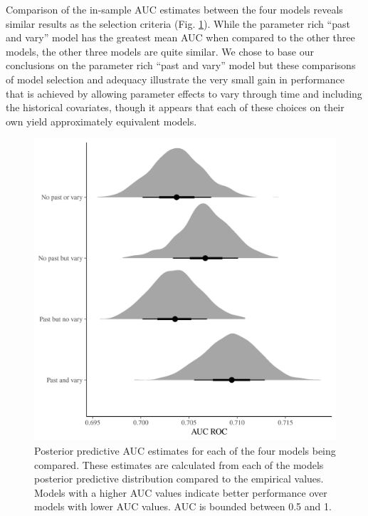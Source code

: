 \documentclass[12pt,letterpaper]{article}
\begin{document}
Comparison of the in-sample AUC estimates between the four models reveals similar results as the selection criteria (Fig. \ref{fig:roc_hist}). While the parameter rich ``past and vary'' model has the greatest mean AUC when compared to the other three models, the other three models are quite similar. We chose to base our conclusions on the parameter rich ``past and vary'' model but these comparisons of model selection and adequacy illustrate the very small gain in performance that is achieved by allowing parameter effects to vary through time and including the historical covariates, though it appears that each of these choices on their own yield approximately equivalent models.
\begin{figure}[ht]
  \centering
  \includegraphics[width=\textwidth,height=0.5\textheight,keepaspectratio=true]{../results/figure/roc_hist}
  \caption{Posterior predictive AUC estimates for each of the four models being compared. These estimates are calculated from each of the models posterior predictive distribution compared to the empirical values. Models with a higher AUC values indicate better performance over models with lower AUC values. AUC is bounded between 0.5 and 1.}
  \label{fig:roc_hist}
\end{figure}
\end{document}
